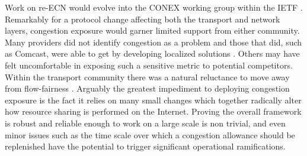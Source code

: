 Work on re-\ac{ECN} would evolve into the \ac{CONEX} working group within the \ac{IETF} \cite{Moncaster:2009p163}.
Remarkably for a protocol change affecting both the transport and network layers, congestion exposure would garner limited support from either community.
Many providers did not identify congestion as a problem and those that did, such as Comcast, were able to get by developing localized solutions \cite{Bastian:2009p495}.
Others may have felt uncomfortable in exposing such a sensitive metric to potential competitors.
Within the transport community there was a natural reluctance to move away from flow-fairness \cite{Floyd:2008p496}.
Arguably the greatest impediment to deploying congestion exposure is the fact it relies on many small changes which together radically alter how resource sharing is performed on the Internet.
Proving the overall framework is robust and reliable enough to work on a large scale is non trivial, and even minor issues such as the time scale over which a congestion allowance should be replenished have the potential to trigger significant operational ramifications.

